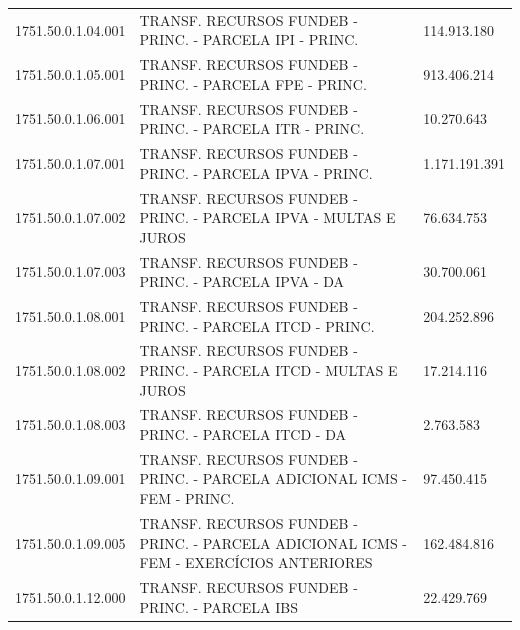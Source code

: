 \documentclass{article}
\begin{document}
\begin{longtable}[c]{m{2.5cm}|m{14cm}|m{1.5cm}}
\multicolumn{1}{L{2.5cm}|}{1751.50.0.1.04.001} & \multicolumn{1}{L{14cm}|}{TRANSF. RECURSOS FUNDEB - PRINC. - PARCELA IPI - PRINC.} & \multicolumn{1}{R{1.5cm}}{114.913.180} \\
\multicolumn{1}{L{2.5cm}|}{1751.50.0.1.05.001} & \multicolumn{1}{L{14cm}|}{TRANSF. RECURSOS FUNDEB - PRINC. - PARCELA FPE - PRINC.} & \multicolumn{1}{R{1.5cm}}{913.406.214} \\
\multicolumn{1}{L{2.5cm}|}{1751.50.0.1.06.001} & \multicolumn{1}{L{14cm}|}{TRANSF. RECURSOS FUNDEB - PRINC. - PARCELA ITR - PRINC.} & \multicolumn{1}{R{1.5cm}}{10.270.643} \\
\multicolumn{1}{L{2.5cm}|}{1751.50.0.1.07.001} & \multicolumn{1}{L{14cm}|}{TRANSF. RECURSOS FUNDEB - PRINC. - PARCELA IPVA - PRINC.} & \multicolumn{1}{R{1.5cm}}{1.171.191.391} \\
\multicolumn{1}{L{2.5cm}|}{1751.50.0.1.07.002} & \multicolumn{1}{L{14cm}|}{TRANSF. RECURSOS FUNDEB - PRINC. - PARCELA IPVA - MULTAS E JUROS} & \multicolumn{1}{R{1.5cm}}{76.634.753} \\
\multicolumn{1}{L{2.5cm}|}{1751.50.0.1.07.003} & \multicolumn{1}{L{14cm}|}{TRANSF. RECURSOS FUNDEB - PRINC. - PARCELA IPVA - DA} & \multicolumn{1}{R{1.5cm}}{30.700.061} \\
\multicolumn{1}{L{2.5cm}|}{1751.50.0.1.08.001} & \multicolumn{1}{L{14cm}|}{TRANSF. RECURSOS FUNDEB - PRINC. - PARCELA ITCD - PRINC.} & \multicolumn{1}{R{1.5cm}}{204.252.896} \\
\multicolumn{1}{L{2.5cm}|}{1751.50.0.1.08.002} & \multicolumn{1}{L{14cm}|}{TRANSF. RECURSOS FUNDEB - PRINC. - PARCELA ITCD - MULTAS E JUROS} & \multicolumn{1}{R{1.5cm}}{17.214.116} \\
\multicolumn{1}{L{2.5cm}|}{1751.50.0.1.08.003} & \multicolumn{1}{L{14cm}|}{TRANSF. RECURSOS FUNDEB - PRINC. - PARCELA ITCD - DA} & \multicolumn{1}{R{1.5cm}}{2.763.583} \\
\multicolumn{1}{L{2.5cm}|}{1751.50.0.1.09.001} & \multicolumn{1}{L{14cm}|}{TRANSF. RECURSOS FUNDEB - PRINC. - PARCELA ADICIONAL ICMS - FEM - PRINC.} & \multicolumn{1}{R{1.5cm}}{97.450.415} \\
\multicolumn{1}{L{2.5cm}|}{1751.50.0.1.09.005} & \multicolumn{1}{L{14cm}|}{TRANSF. RECURSOS FUNDEB - PRINC. - PARCELA ADICIONAL ICMS - FEM - EXERCÍCIOS ANTERIORES} & \multicolumn{1}{R{1.5cm}}{162.484.816} \\
\multicolumn{1}{L{2.5cm}|}{1751.50.0.1.12.000} & \multicolumn{1}{L{14cm}|}{TRANSF. RECURSOS FUNDEB - PRINC. - PARCELA IBS} & \multicolumn{1}{R{1.5cm}}{22.429.769} \\

\end{longtable}
\end{document}
